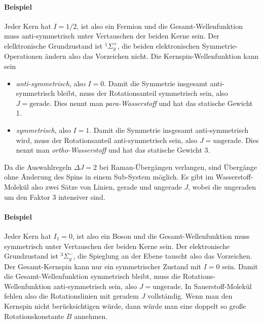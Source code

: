 \paragraph{Beispiel } Jeder Kern hat $I = 1/2$, ist also ein Fermion und die Gesamt-Wellenfunktion muss anti-symmetrisch unter Vertauschen der beiden Kerne sein. 
Der elelktronische Grundzustand ist $^1\Sigma_g^+$, die beiden elektronischen Symmetrie-Operationen ändern also das Vorzeichen nicht.
Die Kernspin-Wellenfunktion kann sein
\begin{itemize}
\item \emph{anti-symmetrisch}, also $I = 0$. Damit die Symmetrie insgesamt anti-symmetrisch bleibt, muss der Rotationsanteil symmetrisch sein, also $J = \text{gerade}$. Dies nennt man \emph{para-Wasserstoff} und hat das statische Gewicht 1.

\item \emph{symmetrisch}, also $I = 1$. Damit die Symmetrie insgesamt anti-symmetrisch wird, muss der Rotationsanteil anti-symmetrisch sein, also $J = \text{ungerade}$. Dies nennt man \emph{ortho-Wasserstoff} und hat das statische Gewicht 3.
\end{itemize}
%
Da die Auswahlregeln $\Delta J = 2$ bei Raman-Übergängen verlangen, sind Übergänge ohne Änderung des Spins in einem Sub-System möglich. Es gibt im Wasserstoff-Molekül  also zwei Sätze von Linien, gerade und ungerade $J$, wobei die ungeraden um den Faktor 3 intensiver sind.




\paragraph{Beispiel } Jeder Kern hat $I_1 = 0$, ist also ein Boson und die Gesamt-Wellenfunktion muss symmetrisch unter Vertauschen der beiden Kerne sein.  Der elektronische Grundzustand ist $^3\Sigma_g^-$, die Spieglung an der Ebene tauscht also das Vorzeichen. Der Gesamt-Kernspin kann nur ein symmetrischer Zustand mit $I = 0$ sein. Damit die Gesamt-Wellenfunktion symmetrisch bleibt, muss die Rotations-Wellenfunktion anti-symmetrisch sein, also $J = \text{ungerade}$. In Sauerstoff-Molekül   fehlen also die Rotationslinien mit geradem $J$ vollständig. Wenn man den Kernspin nicht berücksichtigen würde, dann würde man eine doppelt so große Rotationskonstante $B$ annehmen.





\printbibliography[segment=\therefsegment,heading=subbibliography]
